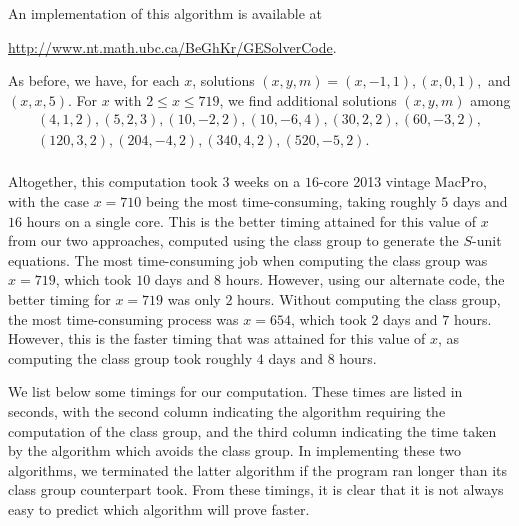 {%

An implementation of this algorithm is available at
\begin{center}
\url{http://www.nt.math.ubc.ca/BeGhKr/GESolverCode}.
\end{center}

As before, we have, for each $x$, solutions $(x,y,m) = (x,-1,1), (x,0,1),$ and $(x,x,5)$. For $x$ with $2 \leq x \leq 719$, we find additional solutions $(x,y,m)$ among 
$$
\begin{array}{c}
(4,1,2), (5,2,3), (10,-2,2), (10,-6,4), (30,2,2), (60,-3,2), \\
(120, 3,2), (204,-4,2), (340, 4,2), (520,-5,2).\\
\end{array}
$$

Altogether, this computation took 3 weeks on a $16$-core 2013 vintage MacPro, with the case $x=710$ being the most time-consuming, taking roughly $5$ days and $16$ hours on a single core. This is the better timing attained for this value of $x$ from our two approaches, computed using the class group to generate the $S$-unit equations. The most time-consuming job when computing the class group was $x = 719$, which took $10$ days and $8$ hours. However, using our alternate code, the better timing for $x = 719$ was only $2$ hours. Without computing the class group, the most time-consuming process was $x = 654$, which took $2$ days and $7$ hours. However, this is the faster timing that was attained for this value of $x$, as computing the class group took roughly $4$ days and $8$ hours. 

We list below some timings for our computation. These times are listed in seconds, with the second column indicating the algorithm requiring the computation of the class group, and the third column indicating the time taken by the algorithm which avoids the class group. In implementing these two algorithms, we terminated the latter algorithm if the program ran longer than its class group counterpart took. From these timings, it is clear that it is not always easy to predict which algorithm will prove faster. 

}
